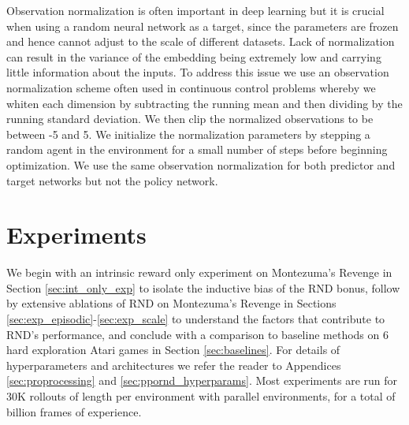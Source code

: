 \documentclass{article} \usepackage[dvipsnames]{xcolor}
\begin{document}
Observation normalization is often important in deep learning but it is  crucial when using a random neural network as a target, since the parameters are frozen and hence cannot adjust to the scale of different datasets. Lack of normalization can result in the variance of the embedding being extremely low and carrying little information about the inputs. To address this issue we use an observation normalization scheme often used in continuous control problems whereby we whiten each dimension by subtracting the running mean and then dividing by the running standard deviation. We then clip the normalized observations to be between -5 and 5. We initialize the normalization parameters by stepping a random agent in the environment for a small number of steps before beginning optimization. We use the same observation normalization for both predictor and target networks but not the policy network.

\section{Experiments}
We begin with an intrinsic reward only experiment on Montezuma's Revenge in Section \ref{sec:int_only_exp} to isolate the inductive bias of the RND bonus, follow by extensive ablations of RND on Montezuma's Revenge in Sections \ref{sec:exp_episodic}-\ref{sec:exp_scale} to understand the factors that contribute to RND's performance, and conclude with a comparison to baseline methods on 6 hard exploration Atari games in Section \ref{sec:baselines}. For details of hyperparameters and architectures we refer the reader to Appendices \ref{sec:proprocessing} and \ref{sec:ppornd_hyperparams}. Most experiments are run for 30K rollouts of length  per environment with  parallel environments, for a total of  billion frames of experience. 
\end{document}
